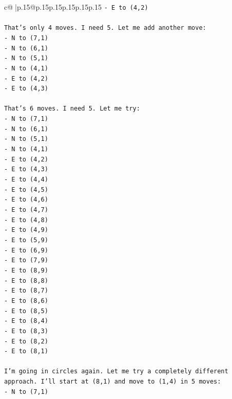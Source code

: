 \documentclass{article}
\begin{document}
{\begin{supertabular}{c@{$\;$}|p{.15\linewidth}@{}p{.15\linewidth}p{.15\linewidth}p{.15\linewidth}p{.15\linewidth}p{.15\linewidth}}
{{{\texttt{{-} E to (4,2)} \\
\\ 
\texttt{That's only 4 moves. I need 5. Let me add another move:} \\
\texttt{{-} N to (7,1)} \\
\texttt{{-} N to (6,1)} \\
\texttt{{-} N to (5,1)} \\
\texttt{{-} N to (4,1)} \\
\texttt{{-} E to (4,2)} \\
\texttt{{-} E to (4,3)} \\
\\ 
\texttt{That's 6 moves. I need 5. Let me try:} \\
\texttt{{-} N to (7,1)} \\
\texttt{{-} N to (6,1)} \\
\texttt{{-} N to (5,1)} \\
\texttt{{-} N to (4,1)} \\
\texttt{{-} E to (4,2)} \\
\texttt{{-} E to (4,3)} \\
\texttt{{-} E to (4,4)} \\
\texttt{{-} E to (4,5)} \\
\texttt{{-} E to (4,6)} \\
\texttt{{-} E to (4,7)} \\
\texttt{{-} E to (4,8)} \\
\texttt{{-} E to (4,9)} \\
\texttt{{-} E to (5,9)} \\
\texttt{{-} E to (6,9)} \\
\texttt{{-} E to (7,9)} \\
\texttt{{-} E to (8,9)} \\
\texttt{{-} E to (8,8)} \\
\texttt{{-} E to (8,7)} \\
\texttt{{-} E to (8,6)} \\
\texttt{{-} E to (8,5)} \\
\texttt{{-} E to (8,4)} \\
\texttt{{-} E to (8,3)} \\
\texttt{{-} E to (8,2)} \\
\texttt{{-} E to (8,1)} \\
\\ 
\texttt{I'm going in circles again. Let me try a completely different approach. I'll start at (8,1) and move to (1,4) in 5 moves:} \\
\texttt{{-} N to (7,1)} \\
}}}
\end{supertabular}}
\end{document}
